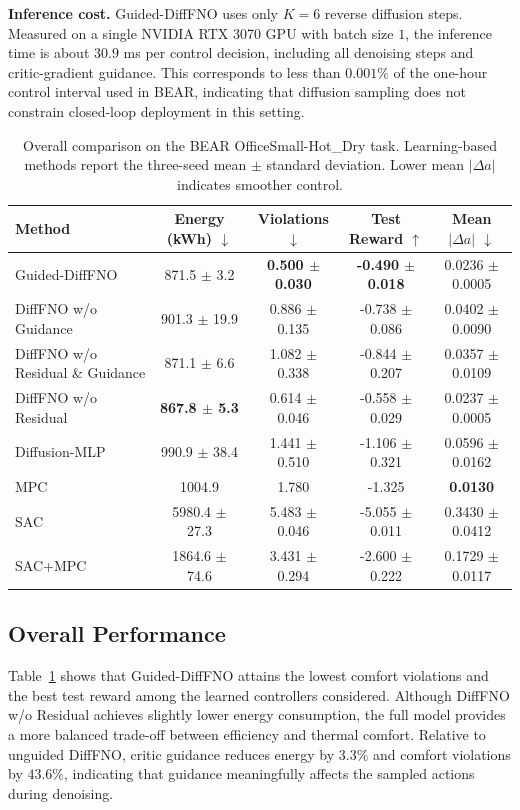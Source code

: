 \documentclass[conference]{IEEEtran}
\theoremstyle{nonumberplain}
\theoremstyle{plain}
\begin{document}
\textbf{Inference cost.} Guided-DiffFNO uses only $K=6$ reverse diffusion steps. Measured on a single NVIDIA RTX 3070 GPU with batch size $1$, the inference time is about $30.9$ ms per control decision, including all denoising steps and critic-gradient guidance. This corresponds to less than $0.001\%$ of the one-hour control interval used in BEAR, indicating that diffusion sampling does not constrain closed-loop deployment in this setting.

\begin{table}[!t]
\centering
\caption{Overall comparison on the BEAR OfficeSmall-Hot\_Dry task. Learning-based methods report the three-seed mean $\pm$ standard deviation. Lower mean $|\Delta a|$ indicates smoother control.}
\label{tab:overall_results}
\footnotesize
\setlength{\tabcolsep}{4.5pt}
\renewcommand{\arraystretch}{1.10}
\begin{tabular}{lcccc}
\hline
Method & Energy (kWh) $\downarrow$ & Violations $\downarrow$ & Test Reward $\uparrow$ & Mean $|\Delta a|$ $\downarrow$ \\
\hline
Guided-DiffFNO & 871.5 $\pm$ 3.2 & \textbf{0.500 $\pm$ 0.030} & \textbf{-0.490 $\pm$ 0.018} & 0.0236 $\pm$ 0.0005 \\
DiffFNO w/o Guidance & 901.3 $\pm$ 19.9 & 0.886 $\pm$ 0.135 & -0.738 $\pm$ 0.086 & 0.0402 $\pm$ 0.0090 \\
DiffFNO w/o Residual \& Guidance & 871.1 $\pm$ 6.6 & 1.082 $\pm$ 0.338 & -0.844 $\pm$ 0.207 & 0.0357 $\pm$ 0.0109 \\
DiffFNO w/o Residual & \textbf{867.8 $\pm$ 5.3} & 0.614 $\pm$ 0.046 & -0.558 $\pm$ 0.029 & 0.0237 $\pm$ 0.0005 \\
Diffusion-MLP & 990.9 $\pm$ 38.4 & 1.441 $\pm$ 0.510 & -1.106 $\pm$ 0.321 & 0.0596 $\pm$ 0.0162 \\
MPC & 1004.9 & 1.780 & -1.325 & \textbf{0.0130} \\
SAC & 5980.4 $\pm$ 27.3 & 5.483 $\pm$ 0.046 & -5.055 $\pm$ 0.011 & 0.3430 $\pm$ 0.0412 \\
SAC+MPC & 1864.6 $\pm$ 74.6 & 3.431 $\pm$ 0.294 & -2.600 $\pm$ 0.222 & 0.1729 $\pm$ 0.0117 \\
\hline
\end{tabular}
\end{table}

\subsection{Overall Performance}

Table~\ref{tab:overall_results} shows that Guided-DiffFNO attains the lowest comfort violations and the best test reward among the learned controllers considered. Although DiffFNO w/o Residual achieves slightly lower energy consumption, the full model provides a more balanced trade-off between efficiency and thermal comfort. Relative to unguided DiffFNO, critic guidance reduces energy by $3.3\%$ and comfort violations by $43.6\%$, indicating that guidance meaningfully affects the sampled actions during denoising.
\end{document}
